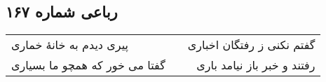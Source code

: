 \begin{center}
\section*{رباعی شماره ۱۶۷}
\label{sec:sh167}
\begin{longtable}{l p{0.5cm} r}
پیری دیدم به خانهٔ خماری
&&
گفتم نکنی ز رفتگان اخباری
\\
گفتا می خور که همچو ما بسیاری
&&
رفتند و خبر باز نیامد باری
\\
\end{longtable}
\end{center}
